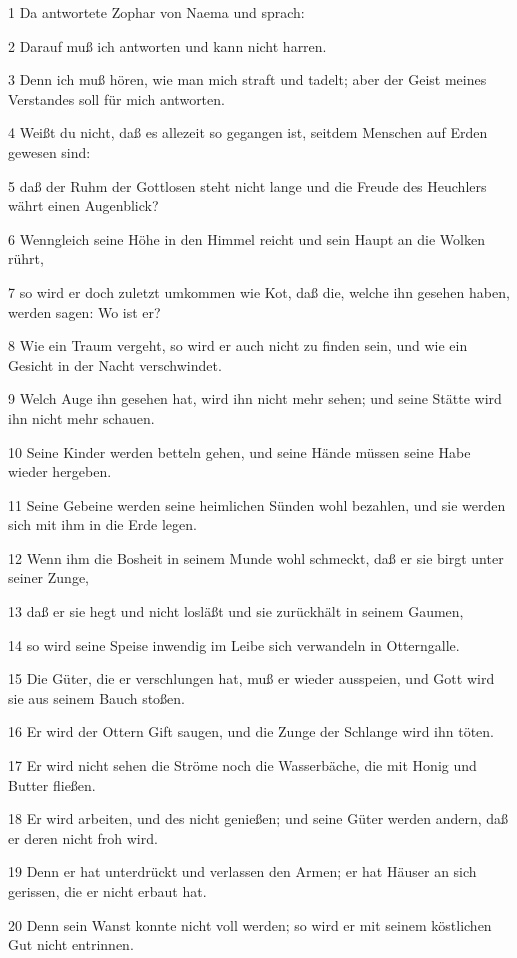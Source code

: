 \par 1 Da antwortete Zophar von Naema und sprach:
\par 2 Darauf muß ich antworten und kann nicht harren.
\par 3 Denn ich muß hören, wie man mich straft und tadelt; aber der Geist meines Verstandes soll für mich antworten.
\par 4 Weißt du nicht, daß es allezeit so gegangen ist, seitdem Menschen auf Erden gewesen sind:
\par 5 daß der Ruhm der Gottlosen steht nicht lange und die Freude des Heuchlers währt einen Augenblick?
\par 6 Wenngleich seine Höhe in den Himmel reicht und sein Haupt an die Wolken rührt,
\par 7 so wird er doch zuletzt umkommen wie Kot, daß die, welche ihn gesehen haben, werden sagen: Wo ist er?
\par 8 Wie ein Traum vergeht, so wird er auch nicht zu finden sein, und wie ein Gesicht in der Nacht verschwindet.
\par 9 Welch Auge ihn gesehen hat, wird ihn nicht mehr sehen; und seine Stätte wird ihn nicht mehr schauen.
\par 10 Seine Kinder werden betteln gehen, und seine Hände müssen seine Habe wieder hergeben.
\par 11 Seine Gebeine werden seine heimlichen Sünden wohl bezahlen, und sie werden sich mit ihm in die Erde legen.
\par 12 Wenn ihm die Bosheit in seinem Munde wohl schmeckt, daß er sie birgt unter seiner Zunge,
\par 13 daß er sie hegt und nicht losläßt und sie zurückhält in seinem Gaumen,
\par 14 so wird seine Speise inwendig im Leibe sich verwandeln in Otterngalle.
\par 15 Die Güter, die er verschlungen hat, muß er wieder ausspeien, und Gott wird sie aus seinem Bauch stoßen.
\par 16 Er wird der Ottern Gift saugen, und die Zunge der Schlange wird ihn töten.
\par 17 Er wird nicht sehen die Ströme noch die Wasserbäche, die mit Honig und Butter fließen.
\par 18 Er wird arbeiten, und des nicht genießen; und seine Güter werden andern, daß er deren nicht froh wird.
\par 19 Denn er hat unterdrückt und verlassen den Armen; er hat Häuser an sich gerissen, die er nicht erbaut hat.
\par 20 Denn sein Wanst konnte nicht voll werden; so wird er mit seinem köstlichen Gut nicht entrinnen.
